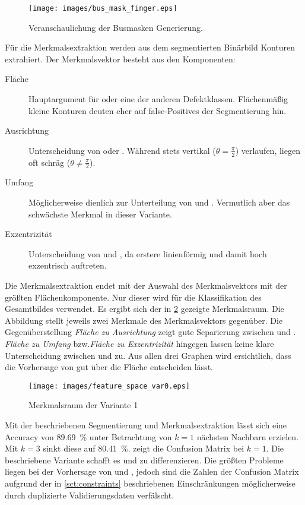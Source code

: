 \begin{figure}[ht]
    \centering
    \texttt{[image: images/bus\_mask\_finger.eps]}
    \caption{Veranschaulichung der Busmasken Generierung.\label{fig:bus_mask_finger}}
\end{figure}

Für die Merkmalsextraktion werden aus dem segmentierten Binärbild Konturen extrahiert. Der Merkmalsvektor besteht aus den Komponenten:
%
\begin{description}
    \item[Fläche] Hauptargument für  oder eine der anderen Defektklassen. Flächenmäßig kleine Konturen deuten eher auf \foreignlanguage{english}{false-Positives} der Segmentierung hin.
    \item[Ausrichtung] Unterscheidung von  oder . Während stets vertikal (\(\theta = \frac{\pi}{2}\)) verlaufen, liegen  oft schräg (\(\theta \neq \frac{\pi}{2}\)).
    \item[Umfang] Möglicherweise dienlich zur Unterteilung von  und . Vermutlich aber das schwächste Merkmal in dieser Variante.
    \item[Exzentrizität] Unterscheidung von  und , da erstere linienförmig und damit hoch exzentrisch auftreten.
\end{description}

Die Merkmalsextraktion endet mit der Auswahl des Merkmalsvektors mit der größten Flächenkomponente. Nur dieser wird für die Klassifikation des Gesamtbildes verwendet. Es ergibt sich der in \cref{fig:feature_space_var0} gezeigte Merkmalsraum. Die Abbildung stellt jeweils zwei Merkmale des Merkmalsvektors gegenüber. Die Gegenüberstellung \emph{Fläche zu Ausrichtung} zeigt gute Separierung zwischen  und . \emph{Fläche zu Umfang} bzw.\@ \emph{Fläche zu Exzentrizität} hingegen lassen keine klare Unterscheidung zwischen  und  zu. Aus allen drei Graphen wird ersichtlich, dass die Vorhersage von  gut über die Fläche entscheiden lässt.

\begin{figure}[htb]
    \centering
    \texttt{[image: images/feature\_space\_var0.eps]}
    \caption{Merkmalsraum der Variante 1\label{fig:feature_space_var0}}
\end{figure}

Mit der beschriebenen Segmentierung und Merkmalsextraktion lässt sich eine \foreignlanguage{english}{Accuracy} von \SI{89.69}{\percent} unter Betrachtung von \(k = 1\) nächsten Nachbarn erzielen. Mit \(k = 3\) sinkt diese auf \SI{80.41}{\percent}.  zeigt die \foreignlanguage{english}{Confusion Matrix} bei \(k = 1\). Die beschriebene Variante schafft es  und  zu differenzieren. Die größten Probleme liegen bei der Vorhersage von  und , jedoch sind die Zahlen der \foreignlanguage{english}{Confusion Matrix} aufgrund der in \cref{sct:constraints} beschriebenen Einschränkungen möglicherweise durch duplizierte Validierungsdaten verfälscht.

